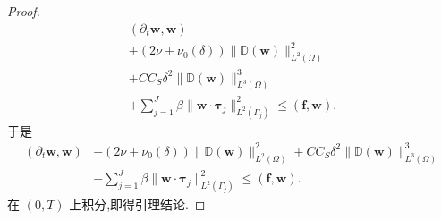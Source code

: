 \begin{lemma}[$\bm{w}$ 的能量不等式]
\begin{proof}
\[
\begin{gathered}
 (\partial_t\bm{w},\bm{w})\\
 +(2\nu+\nu_0(\delta))
      \|\mathbb{D}(\bm{w})\|_{L^2(\Omega)}^2\\
 +C C_S\delta^2\|\mathbb{D}(\bm{w})\|_{L^3(\Omega)}^3\\
 +\sum_{j=1}^J\beta
      \|\bm{w}\cdot\symbf{\tau}_j\|_{L^2(\Gamma_j)}^2
 \le(\bm{f},\bm{w}).
\end{gathered}
\]
于是
\[
\begin{aligned}
 (\partial_t\bm{w},\bm{w})
 &+(2\nu+\nu_0(\delta))
      \|\mathbb{D}(\bm{w})\|_{L^2(\Omega)}^2
  +C C_S\delta^2
      \|\mathbb{D}(\bm{w})\|_{L^3(\Omega)}^3\\
 &+\sum_{j=1}^J\beta
      \|\bm{w}\cdot\symbf{\tau}_j\|_{L^2(\Gamma_j)}^2
 \le(\bm{f},\bm{w}).
\end{aligned}
\]
在 $(0,T)$ 上积分,即得引理结论.
\end{proof}
\end{lemma}

